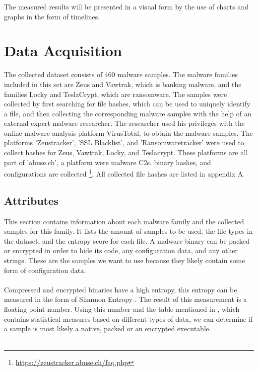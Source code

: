 \documentclass[conference]{IEEEtran}
\begin{document}
The measured results will be presented in a visual form by the use of charts and graphs in the form of timelines.


\section{Data Acquisition}

The collected dataset consists of 460 malware samples. The malware families included in this set are Zeus and Vawtrak, which is banking malware, and the families Locky and TeslaCrypt, which are ransomware.  The samples were collected  by first searching for file hashes, which can be used to uniquely identify a file,  and then collecting the corresponding malware samples with the help of an external expert malware researcher. The researcher used his privileges with the online malware analysis platform VirusTotal, to obtain the malware samples. The platforms 'Zeustracker', 'SSL Blacklist', and 'Ransomwaretracker' were used to collect hashes for Zeus, Vawtrak, Locky, and Teslacrypt. These platforms are all part of 'abuse.ch', a platform were malware \Gls{C2}s. binary hashes, and configurations are collected \footnote{\url{https://zeustracker.abuse.ch/faq.php}}. All collected file hashes are listed in appendix A.

\subsection{Attributes}	
This section contains information about each malware family and the collected samples for this family. It lists the amount of samples to be used, the file types in the dataset, and the entropy score for each file. A malware binary can be packed or encrypted in order to hide its code, any \Gls{configuration data}, and any other strings. These are the samples we want to use because they likely contain some form of \Gls{configuration data}. \\\\Compressed and encrypted binaries have a high entropy, this entropy can be measured in the form of Shannon Entropy \cite{hamrock-entropy}. The result of this measurement is a floating point number. Using this number and the table mentioned in \cite{hamrock-entropy}, which contains statistical measures based on different types of data, we can determine if a sample is most likely a native, packed or an encrypted executable.
\\\\
\end{document}

